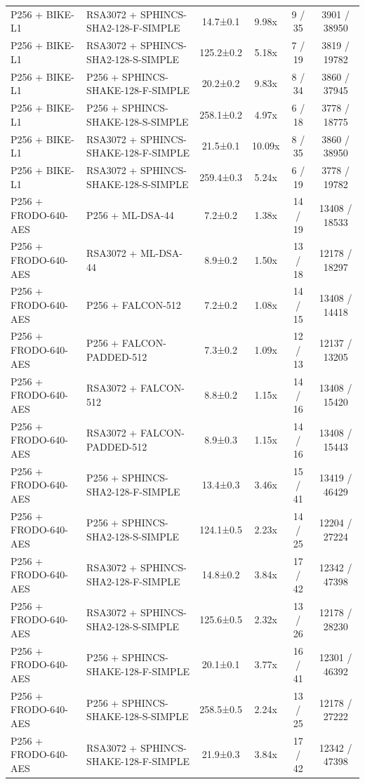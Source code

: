 \documentclass[10pt]{article}
\begin{document}
\begin{tabular}{@{}l l c c c c@{}}
P256 + BIKE-L1 & RSA3072 + SPHINCS-SHA2-128-F-SIMPLE & 14.7±0.1 & 9.98x & 9 / 35 & 3901 / 38950 \\
P256 + BIKE-L1 & RSA3072 + SPHINCS-SHA2-128-S-SIMPLE & 125.2±0.2 & 5.18x & 7 / 19 & 3819 / 19782 \\
P256 + BIKE-L1 & P256 + SPHINCS-SHAKE-128-F-SIMPLE & 20.2±0.2 & 9.83x & 8 / 34 & 3860 / 37945 \\
P256 + BIKE-L1 & P256 + SPHINCS-SHAKE-128-S-SIMPLE & 258.1±0.2 & 4.97x & 6 / 18 & 3778 / 18775 \\
P256 + BIKE-L1 & RSA3072 + SPHINCS-SHAKE-128-F-SIMPLE & 21.5±0.1 & 10.09x & 8 / 35 & 3860 / 38950 \\
P256 + BIKE-L1 & RSA3072 + SPHINCS-SHAKE-128-S-SIMPLE & 259.4±0.3 & 5.24x & 6 / 19 & 3778 / 19782 \\
P256 + FRODO-640-AES & P256 + ML-DSA-44 & 7.2±0.2 & 1.38x & 14 / 19 & 13408 / 18533 \\
P256 + FRODO-640-AES & RSA3072 + ML-DSA-44 & 8.9±0.2 & 1.50x & 13 / 18 & 12178 / 18297 \\
P256 + FRODO-640-AES & P256 + FALCON-512 & 7.2±0.2 & 1.08x & 14 / 15 & 13408 / 14418 \\
P256 + FRODO-640-AES & P256 + FALCON-PADDED-512 & 7.3±0.2 & 1.09x & 12 / 13 & 12137 / 13205 \\
P256 + FRODO-640-AES & RSA3072 + FALCON-512 & 8.8±0.2 & 1.15x & 14 / 16 & 13408 / 15420 \\
P256 + FRODO-640-AES & RSA3072 + FALCON-PADDED-512 & 8.9±0.3 & 1.15x & 14 / 16 & 13408 / 15443 \\
P256 + FRODO-640-AES & P256 + SPHINCS-SHA2-128-F-SIMPLE & 13.4±0.3 & 3.46x & 15 / 41 & 13419 / 46429 \\
P256 + FRODO-640-AES & P256 + SPHINCS-SHA2-128-S-SIMPLE & 124.1±0.5 & 2.23x & 14 / 25 & 12204 / 27224 \\
P256 + FRODO-640-AES & RSA3072 + SPHINCS-SHA2-128-F-SIMPLE & 14.8±0.2 & 3.84x & 17 / 42 & 12342 / 47398 \\
P256 + FRODO-640-AES & RSA3072 + SPHINCS-SHA2-128-S-SIMPLE & 125.6±0.5 & 2.32x & 13 / 26 & 12178 / 28230 \\
P256 + FRODO-640-AES & P256 + SPHINCS-SHAKE-128-F-SIMPLE & 20.1±0.1 & 3.77x & 16 / 41 & 12301 / 46392 \\
P256 + FRODO-640-AES & P256 + SPHINCS-SHAKE-128-S-SIMPLE & 258.5±0.5 & 2.24x & 13 / 25 & 12178 / 27222 \\
P256 + FRODO-640-AES & RSA3072 + SPHINCS-SHAKE-128-F-SIMPLE & 21.9±0.3 & 3.84x & 17 / 42 & 12342 / 47398 \\

\end{tabular}
\end{document}
